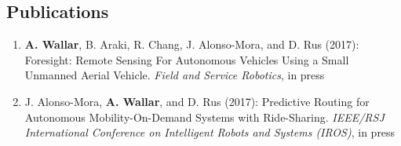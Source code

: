 \documentclass[line,margin]{cv}
\begin{document}
\begin{resume}
%
%
%
%
%
%
%
\section{Publications}

\begin{enumerate}

    \item \textbf{A. Wallar}, B. Araki, R. Chang, J. Alonso-Mora, and D. Rus (2017):
        Foresight: Remote Sensing For Autonomous Vehicles Using a Small Unmanned Aerial Vehicle.
        \textit{Field and Service Robotics}, in press

    \item J. Alonso-Mora, \textbf{A. Wallar}, and D. Rus (2017): Predictive Routing for Autonomous
        Mobility-On-Demand Systems with Ride-Sharing.
        \textit{IEEE/RSJ International Conference on Intelligent Robots and Systems (IROS)}, in press


\end{enumerate}
\end{resume}
\end{document}
